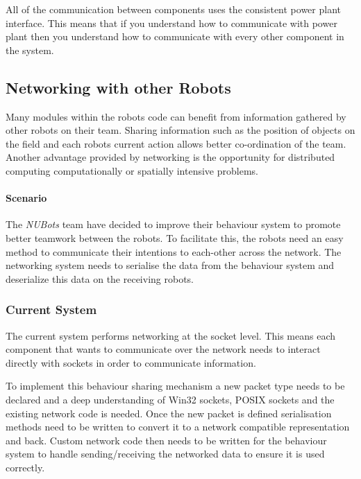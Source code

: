 \documentclass[english,12pt]{scrartcl}
\begin{document}
				All of the communication between components uses the consistent power plant interface. This means that if you
				understand how to communicate with power plant then you understand how to communicate with every other component
				in the system.


		\subsection{Networking with other Robots}
			Many modules within the robots code can benefit from information gathered by other robots on their team. Sharing information such as the position of objects on the field and each robots current action allows better co-ordination of the team. Another advantage provided by networking
			is the opportunity for distributed computing computationally or spatially intensive problems.
			
			\paragraph{Scenario} The \emph{NUBots} team have decided to improve their behaviour system to promote better teamwork between the robots. To facilitate this, the robots need an easy method to communicate their intentions to each-other across the network. The networking
			system needs to serialise the data from the behaviour system and deserialize this data on the receiving robots.
			
			\subsubsection{Current System}
				The current system performs networking at the socket level. This means each component
				that wants to communicate over the network needs to interact directly with sockets in order
				to communicate information.
				
				To implement this behaviour sharing mechanism a new packet type needs to be declared and a deep
				understanding of Win32 sockets, POSIX sockets and the existing network code is needed. Once the new
				packet is defined serialisation methods need to be written to convert it to a network compatible representation
				and back. Custom network code then needs to be written for the behaviour system to handle sending/receiving the
				networked data to ensure it is used correctly.
				
\end{document}
